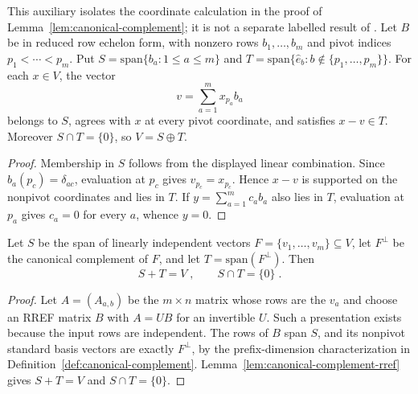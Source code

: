 \begin{lemma}\label{lem:canonical-complement-rref}
  \leanok
  This auxiliary isolates the coordinate calculation in the proof of
  Lemma~\ref{lem:canonical-complement}; it is not a separate labelled result
  of \cite{Ji2020MIPStar}. Let $B$ be in reduced row echelon form, with
  nonzero rows $b_1,\ldots,b_m$ and pivot indices $p_1<\cdots<p_m$.
  Put $S=\mathrm{span}\{b_a:1\le a\le m\}$ and
  $T=\mathrm{span}\{\hat e_b:b\notin\{p_1,\ldots,p_m\}\}$.
  For each $x\in V$, the vector
  \[
    v=\sum_{a=1}^m x_{p_a} b_a
  \]
  belongs to $S$, agrees with $x$ at every pivot coordinate, and satisfies
  $x-v\in T$. Moreover $S\cap T=\{0\}$, so $V=S\oplus T$.
\end{lemma}
\begin{proof}
  \leanok
  Membership in $S$ follows from the displayed linear combination.
  Since $b_a(p_c)=\delta_{ac}$, evaluation at $p_c$ gives $v_{p_c}=x_{p_c}$.
  Hence $x-v$ is supported on the nonpivot coordinates and lies in $T$.
  If $y=\sum_{a=1}^m c_a b_a$ also lies in $T$, evaluation at $p_a$ gives $c_a=0$
  for every $a$, whence $y=0$.
\end{proof}

\begin{lemma}\label{lem:canonical-complement}
	\leanok
	Let $S$ be the span of linearly independent vectors
	$F = \{v_1, \dots, v_m\} \subseteq V$, let $F^\perp$ be the canonical
	complement of $F$, and let $T = \mathrm{span}(F^\perp)$. Then
	\[
		S + T = V\;, \qquad S \cap T = \{0\}\;.
	\]
\end{lemma}
\begin{proof}
	\leanok
	Let $A = (A_{a,b})$ be the $m \times n$ matrix whose rows are the $v_a$ and
	choose an RREF matrix $B$ with $A=UB$ for an invertible $U$.
	Such a presentation exists because the input rows are independent.
	The rows of $B$ span $S$, and its nonpivot standard basis vectors are
	exactly $F^\perp$, by the prefix-dimension characterization in
	Definition~\ref{def:canonical-complement}.
	Lemma~\ref{lem:canonical-complement-rref} gives
	$S+T=V$ and $S\cap T=\{0\}$.
\end{proof}

